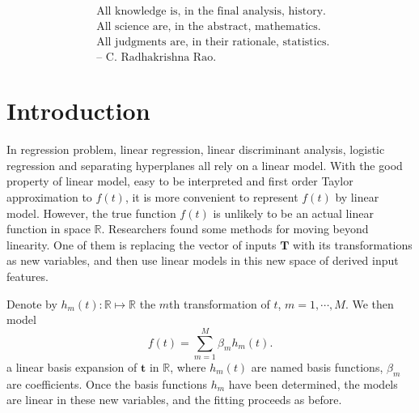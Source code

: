 \begin{align*}
&\mbox{All knowledge is, in the final analysis, history.}\\
&\mbox{All science are, in the abstract, mathematics.}\\
&\mbox{All judgments are, in their rationale, statistics. }\\
&\mbox{-- C. Radhakrishna Rao.}
\end{align*}


\section{Introduction}


In regression problem, linear regression, linear discriminant analysis, logistic regression and separating hyperplanes all rely on a linear model. With the good property of linear model, easy to be interpreted and first order Taylor approximation to $f(t)$, it is more convenient to represent $f(t)$ by linear model. However, the true function $f(t)$ is unlikely to be an actual linear function in space $\mathbb{R}$. Researchers found some methods for moving beyond linearity. One of them is replacing the vector of inputs $\mathbf{T}$ with its transformations as new variables, and then use linear models in this new space of derived input features.

Denote by $h_m(t):\mathbb{R} \mapsto \mathbb{R}$ the $m$th transformation of $t$, $m =1, \cdots ,M$. We then model
\begin{equation}\label{fbasis}
f(t) =\sum_{m=1}^{M}\beta_mh_m(t).
\end{equation}
a linear basis expansion of $\mathbf{t}$ in $\mathbb{R}$, where $h_m(t)$ are named basis functions, $\beta_m$ are coefficients. Once the basis functions $h_m$ have been determined, the models are linear in these new variables, and the fitting proceeds as before.


